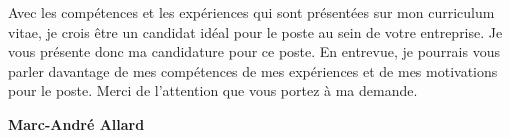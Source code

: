\vfill
Avec les compétences et les expériences qui sont présentées sur mon curriculum
vitae, je crois être un candidat idéal pour le poste \Poste au sein de votre
entreprise. Je vous présente donc ma candidature pour ce poste. En entrevue, je
pourrais vous parler davantage de mes compétences de mes expériences et de mes
motivations pour le poste.
\vfill
Merci de l'attention que vous portez à ma demande.
\vfill
\begin{flushright}
{\bfseries Marc-André Allard}\\
\end{flushright}
\vfill
